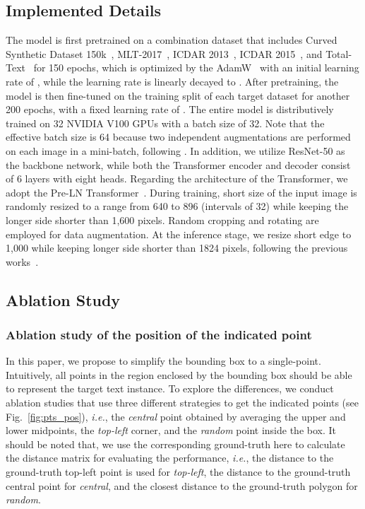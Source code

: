 \documentclass[sigconf]{acmart}
\begin{document}
\subsection{Implemented Details}
The model is first pretrained on a combination dataset that includes Curved Synthetic Dataset 150k~\cite{liu2020abcnet}, MLT-2017~\cite{nayef2017icdar2017}, ICDAR 2013~\cite{karatzas2013icdar}, ICDAR 2015~\cite{karatzas2015icdar}, and Total-Text~\cite{ch2017total} for 150 epochs, which is optimized by the AdamW~\cite{loshchilov2017decoupled} with an initial learning rate of , while the learning rate is linearly decayed to . After pretraining, the model is then fine-tuned on the training split of each target dataset for another 200 epochs, with a fixed learning rate of . The entire model is distributively trained on 32 NVIDIA V100 GPUs with a batch size of 32. Note that the effective batch size is 64 because two independent augmentations are performed on each image in a mini-batch, following \cite{chen2021pix2seq,hoffer2020augment}. In addition, we utilize ResNet-50 as the backbone network, while both the Transformer encoder and decoder consist of 6 layers with eight heads. Regarding the architecture of the Transformer, we adopt the Pre-LN Transformer~\cite{xiong2020layer}.
During training, short size of the input image is randomly resized to a range from 640 to 896 (intervals of 32) while keeping the longer side shorter than 1,600 pixels. Random cropping and rotating are employed for data augmentation. At the inference stage, we resize short edge to 1,000 while keeping longer side shorter than 1824 pixels, following the previous works~\cite{liu2020abcnet,liu2021abcnetv2}.


\subsection{Ablation Study} 
\label{subsec:abs}
    
    
    
\subsubsection{Ablation study of the position of the indicated point}
In this paper, we propose to simplify the bounding box to a single-point. Intuitively, all points in the region enclosed by the bounding box should be able to represent the target text instance. To explore the differences, we conduct ablation studies that use three different strategies to get the indicated points (see Fig.~\ref{fig:pts_pos}), \emph{i.e.}, the \emph{central} point obtained by averaging the upper and lower midpoints, the \emph{top-left} corner, and the \emph{random} point inside the box. It should be noted that, we use the corresponding ground-truth here to calculate the distance matrix for evaluating the performance, \emph{i.e.}, the distance to the ground-truth top-left point is used for \emph{top-left}, the distance to the ground-truth central point for \emph{central}, and the closest distance to the ground-truth polygon for \emph{random}.
    
\end{document}
